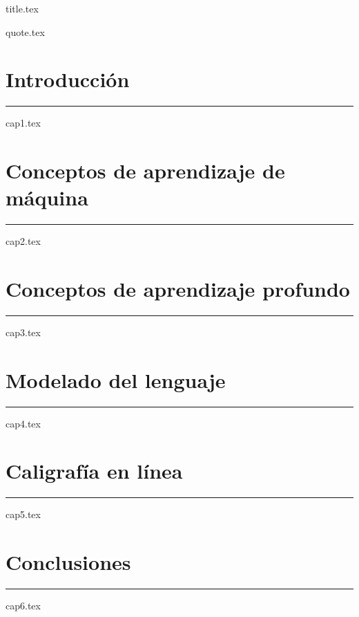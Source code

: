 \documentclass[12 pt]{book}
\numberwithin{equation}{section}
\theoremstyle{plain}
\theoremstyle{definition}
\begin{document}
\frontmatter
{title.tex}

{quote.tex}

\let\cleardoublepage\clearpage
\tableofcontents
\clearpage
\thispagestyle{empty}

\let\cleardoublepage\clearpage

\mainmatter
\ChTitleUpperCase

\chapter{Introducción}
\noindent
\rule{\textwidth}{1pt}
{cap1.tex}
\chapter{Conceptos de aprendizaje de máquina}
\noindent
\rule{\textwidth}{1pt}
{cap2.tex}
\chapter{Conceptos de aprendizaje profundo}
\noindent
\rule{\textwidth}{1pt}
{cap3.tex}
\chapter{Modelado del lenguaje}
\noindent
\rule{\textwidth}{1pt}
{cap4.tex}
\chapter{Caligrafía en línea}
\noindent
\rule{\textwidth}{1pt}
{cap5.tex}
\chapter{Conclusiones}
\noindent
\rule{\textwidth}{1pt}
{cap6.tex}

\backmatter



\newpage
\end{document}
